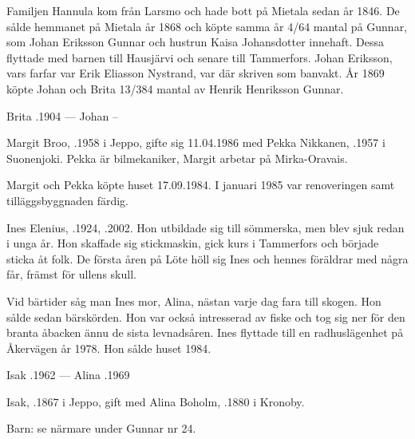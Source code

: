 Familjen Hannula kom från Larsmo och hade bott på Mietala sedan år 1846. De sålde hemmanet på Mietala år 1868 och köpte samma år 4/64 mantal på Gunnar, som Johan Eriksson Gunnar och hustrun Kaisa Johansdotter innehaft. Dessa flyttade med barnen till Hausjärvi och senare till Tammerfors. Johan Eriksson, vars farfar var Erik Eliasson Nystrand, var där skriven som banvakt. År 1869 köpte Johan och Brita 13/384 mantal av Henrik Henriksson Gunnar.

Brita .1904  ---  Johan --






Margit Broo, .1958 i Jeppo, gifte sig 11.04.1986 med Pekka Nikkanen, .1957 i Suonenjoki. Pekka är bilmekaniker, Margit arbetar på Mirka-Oravais.
\begin{jhchildren}
  \item {}
  \item {}
\end{jhchildren}

Margit och Pekka köpte huset 17.09.1984. I januari 1985 var renoveringen samt tilläggsbyggnaden färdig.


Ines Elenius, .1924, .2002. Hon utbildade sig till sömmerska, men blev sjuk redan i unga år. Hon skaffade sig stickmaskin, gick kurs i Tammerfors och började sticka åt folk. De första åren på Löte höll sig Ines och hennes föräldrar med några får, främst för ullens skull.

Vid bärtider såg man Ines mor, Alina, nästan varje dag fara till skogen. Hon sålde sedan bärskörden. Hon var också intresserad av fiske och tog sig ner för den branta åbacken ännu de sista levnadsåren. Ines flyttade till en radhuslägenhet på Åkervägen år 1978. Hon sålde huset 1984.

Isak .1962  ---  Alina .1969


Isak, .1867 i Jeppo, gift med Alina Boholm, .1880 i Kronoby.

Barn: se närmare under Gunnar nr 24.


